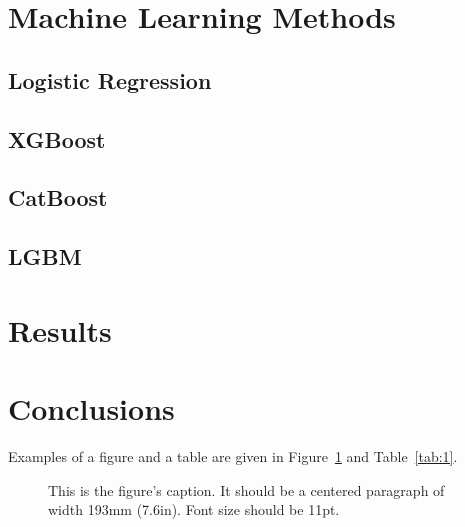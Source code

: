 \documentclass[notitlepage,12pt]{jedm}
\begin{document}
\begin{table}[h!]
\begin{tabular}{| l | l | l | l |}
    \hline    
  \end{tabular}
  
\end{table}

\section{Machine Learning Methods}
\subsection{Logistic Regression}
\subsection{XGBoost}
\subsection{CatBoost}
\subsection{LGBM}

\section{Results}

\section{Conclusions}
Examples of a figure and a table are given in Figure~\ref{tab:fig1} and Table~\ref{tab:1}.

\begin{figure}[h!]
  \centerline{}
  \caption{This is the figure's caption.  It should be a centered paragraph of width 193mm (7.6in). Font size should be 11pt.}
  \label{tab:fig1}
\end{figure}

\end{document}
